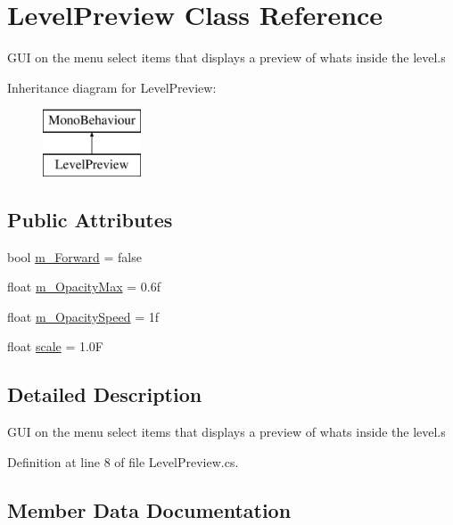 \hypertarget{class_level_preview}{}\section{Level\+Preview Class Reference}
\label{class_level_preview}


G\+UI on the menu select items that displays a preview of whats inside the level.\+s  


Inheritance diagram for Level\+Preview\+:\begin{figure}[H]
\begin{center}
\leavevmode
\includegraphics[height=2.000000cm]{class_level_preview}
\end{center}
\end{figure}
\subsection*{Public Attributes}
\begin{DoxyCompactItemize}
\item 
bool \mbox{\hyperlink{class_level_preview_a69565aa8e2229caa7324a3819f9d4151}{m\+\_\+\+Forward}} = false
\item 
float \mbox{\hyperlink{class_level_preview_a093eee8216a6cd9a4e9df3bafaa499c4}{m\+\_\+\+Opacity\+Max}} = 0.\+6f
\item 
float \mbox{\hyperlink{class_level_preview_ac0f6398d00a9b0034c3dddcc65bb43ff}{m\+\_\+\+Opacity\+Speed}} = 1f
\item 
float \mbox{\hyperlink{class_level_preview_a5f45d3813175e1162195302258d41000}{scale}} = 1.\+0F
\end{DoxyCompactItemize}


\subsection{Detailed Description}
G\+UI on the menu select items that displays a preview of whats inside the level.\+s 



Definition at line 8 of file Level\+Preview.\+cs.



\subsection{Member Data Documentation}
\mbox{\label{class_level_preview_a69565aa8e2229caa7324a3819f9d4151}} 
